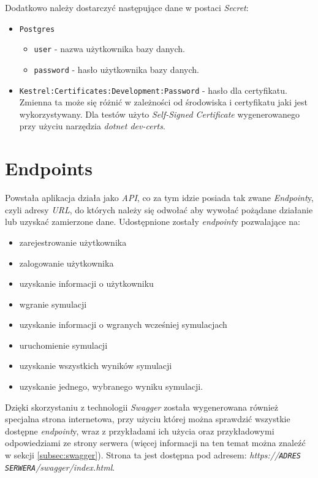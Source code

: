 \par Dodatkowo należy dostarczyć następujące dane w postaci \emph{\dotnet{} Secret}:
\begin{itemize}
	\item \texttt{Postgres}
	\begin{itemize}
		\item \texttt{user} - nazwa użytkownika bazy danych.
		\item \texttt{password} - hasło użytkownika bazy danych.
	\end{itemize}
	\item \texttt{Kestrel:Certificates:Development:Password} - hasło dla certyfikatu. Zmienna ta może się różnić w zależności od środowiska i certyfikatu jaki jest wykorzystywany. Dla testów użyto \emph{Self-Signed Certificate} wygenerowanego przy użyciu narzędzia \emph{dotnet dev-certs}.
\end{itemize}

\section{Endpoints}

\par Powstała aplikacja działa jako \emph{API}, co za tym idzie posiada tak zwane \emph{Endpoint}y, czyli adresy \emph{URL}, do których należy się odwołać aby wywołać pożądane działanie lub uzyskać zamierzone dane. Udostępnione zostały \emph{endpoint}y pozwalające na:
\begin{itemize}
	\item zarejestrowanie użytkownika
	\item zalogowanie użytkownika
	\item uzyskanie informacji o użytkowniku
	\item wgranie symulacji
	\item uzyskanie informacji o wgranych wcześniej symulacjach
	\item uruchomienie symulacji
	\item uzyskanie wszystkich wyników symulacji
	\item uzyskanie jednego, wybranego wyniku symulacji.
\end{itemize}

\par Dzięki skorzystaniu z technologii \emph{Swagger} została wygenerowana również specjalna strona internetowa, przy użyciu której można sprawdzić wszystkie dostępne \emph{endpoint}y, wraz z przykładami ich użycia oraz przykładowymi odpowiedziami ze strony serwera (więcej informacji na ten temat można znaleźć w sekcji \ref{subsec:swagger}). Strona ta jest dostępna pod adresem: \emph{https://\texttt{ADRES SERWERA}/swagger/index.html}.

